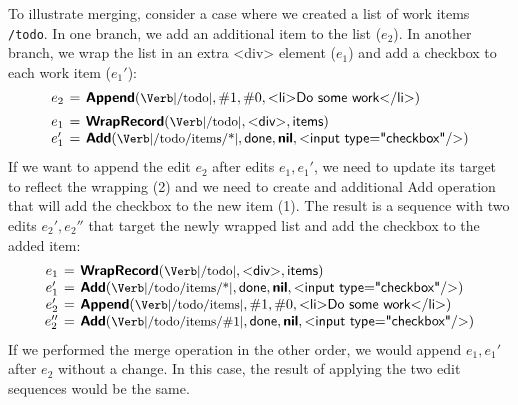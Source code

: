 \documentclass[sigconf,anonymous,screen]{acmart}
\newcommand{\ident}[1]{{\sffamily #1}}
\newcommand{\srcid}[1]{\textnormal{\sffamily #1}}
\newcommand{\srckvd}[1]{\textnormal{\sffamily\bfseries #1}}
\begin{document}
To illustrate merging, consider a case where we created a list of work items {\small\Verb|/todo|}.
In one branch, we add an additional item to the list ($e_2$). In another branch, we wrap the
list in an extra \ident{<div>} element ($e_1$) and add a checkbox to each work item ($e_1'$):
%
\begin{equation*}
\arraycolsep=2pt
\begin{array}{rcl}
e_2 &=& \srckvd{Append}(\textnormal{\small\Verb|/todo|}, \#1, \#0, \srcid{<li>Do some work</li>})\\[0.5em]
e_1 &=& \srckvd{WrapRecord}(\textnormal{\small\Verb|/todo|}, \srcid{<div>}, \srcid{items})\\
e_1' &=& \srckvd{Add}(\textnormal{\small\Verb|/todo/items/*|}, \srcid{done}, \srckvd{nil}, \srcid{<input type="checkbox"/>})\\
\end{array}
\end{equation*}
%
If we want to append the edit $e_2$ after edits $e_1, e_1'$, we need to update its target to
reflect the wrapping (2) and we need to create and additional \ident{Add} operation
that will add the checkbox to the new item (1). The result is a sequence with two edits $e_2', e_2''$
that target the newly wrapped list and add the checkbox to the added item:
%
\begin{equation*}
\arraycolsep=2pt
\begin{array}{rcl}
  e_1 &=& \srckvd{WrapRecord}(\textnormal{\small\Verb|/todo|}, \srcid{<div>}, \srcid{items})\\
  e_1' &=& \srckvd{Add}(\textnormal{\small\Verb|/todo/items/*|}, \srcid{done}, \srckvd{nil}, \srcid{<input type="checkbox"/>})\\
e_2'  &=& \srckvd{Append}(\textnormal{\small\Verb|/todo/items|}, \#1, \#0, \srcid{<li>Do some work</li>})\\
e_2'' &=& \srckvd{Add}(\textnormal{\small\Verb|/todo/items/\#1|}, \srcid{done}, \srckvd{nil}, \srcid{<input type="checkbox"/>})\\
\end{array}
\end{equation*}
%
If we performed the merge operation in the other order, we would append $e_1, e_1'$ after
$e_2$ without a change. In this case, the result of applying the two edit sequences would be the
same.


\end{document}
